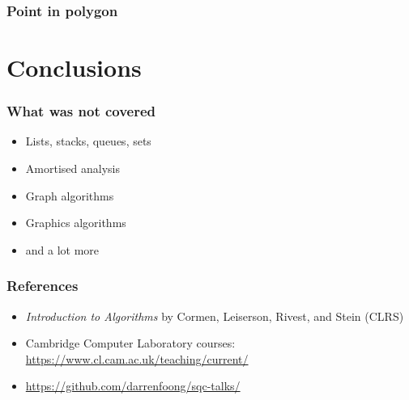 \documentclass{beamer}
\begin{document}
\begin{frame}
 \frametitle{Point in polygon}
\end{frame}

\section{Conclusions}

\begin{frame}
 \frametitle{What was not covered}
 \begin{itemize}
  \item Lists, stacks, queues, sets
  \item Amortised analysis
  \item Graph algorithms
  \item Graphics algorithms
  \item and a lot more
 \end{itemize}
\end{frame}

\begin{frame}
 \frametitle{References}
 \begin{itemize}
  \item \emph{Introduction to Algorithms} by Cormen, Leiserson, Rivest, and Stein (CLRS)
  \item Cambridge Computer Laboratory courses: \url{https://www.cl.cam.ac.uk/teaching/current/}
  \item \url{https://github.com/darrenfoong/sqc-talks/}
 \end{itemize}
\end{frame}
\end{document}
